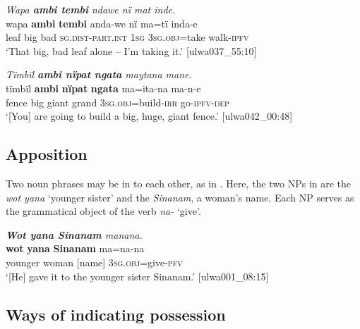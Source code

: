 
\ea%
    \label{ex:phrase:6}
            \textit{Wapa \textbf{ambi tembi} ndawe nï mat inde.}\\
\gll    wapa  \textbf{ambi}  \textbf{tembi}  anda-we      nï    ma=tï inda-e\\
    leaf  big    bad    \textsc{sg.dist-part.int}  \textsc{1sg}  \textsc{3sg.obj=}take    walk-\textsc{ipfv}\\
\glt `That big, bad leaf alone -- I’m taking it.’ [ulwa037\_55:10]
\z

\ea%
    \label{ex:phrase:7}
            \textit{Tïmbïl \textbf{ambi nïpat ngata} maytana mane.}\\
\gll    tïmbïl  \textbf{ambi}  \textbf{nïpat}  \textbf{ngata}  ma=ita-na        ma-n-e\\
    fence  big    giant  grand  3\textsc{sg.obj}=build-\textsc{irr}  go-\textsc{ipfv-dep}\\
\glt `[You] are going to build a big, huge, giant fence.’ [ulwa042\_00:48]
\z

\subsection{Apposition}\label{sec:9.1.4}


Two noun phrases may be in  to each other, as in . Here, the two NPs in  are the  \textit{wot yana} ‘younger sister’ and the  \textit{Sinanam}, a woman’s name. Each NP serves as the  grammatical object of the verb \textit{na-} ‘give’.


\ea%
    \label{ex:phrase:8}
            \textit{\textbf{Wot yana Sinanam} manana.}\\
\gll    \textbf{wot}    \textbf{yana}    \textbf{Sinanam}  ma=na-na\\
    younger  woman    [name]    3\textsc{sg.obj}=give-\textsc{pfv}\\
\glt `[He] gave it to the younger sister Sinanam.’ [ulwa001\_08:15]
\z

\subsection{Ways of indicating possession}\label{sec:9.1.5}


